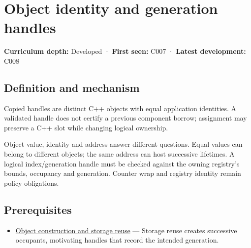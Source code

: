 \hypertarget{appendix-f1581457d322}{}\label{referencestart:appendix-f1581457d322}
\section{Object identity and generation handles}\label{appendix-f1581457d322-object-identity-and-generation-handles}

\hypertarget{appendix-f1581457d322-object-identity-and-generation-handles}{}

\textbf{Curriculum depth:} Developed · \textbf{First seen:} C007 · \textbf{Latest development:} C008

\begin{allmightroledefinition}

\subsection{Definition and mechanism}\label{appendix-f1581457d322-definition-and-mechanism}

\hypertarget{appendix-f1581457d322-definition-and-mechanism}{}

Copied handles are distinct C++ objects with equal application identities. A validated handle does not certify a previous component borrow; assignment may preserve a C++ slot while changing logical ownership.

\end{allmightroledefinition}

Object value, identity and address answer different questions. Equal values can belong to different objects; the same address can host successive lifetimes. A logical index/generation handle must be checked against the owning registry's bounds, occupancy and generation. Counter wrap and registry identity remain policy obligations.

\subsection{Prerequisites}\label{appendix-f1581457d322-prerequisites}

\hypertarget{appendix-f1581457d322-prerequisites}{}

\begin{itemize}
\tightlist
\item
  \hyperref[appendix-a82f9c438857]{Object construction and storage reuse} --- Storage reuse creates successive occupants, motivating handles that record the intended generation.
\end{itemize}

